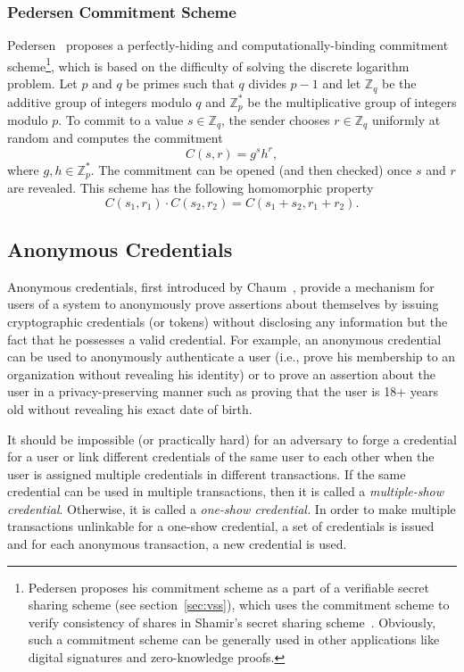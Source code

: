 \documentclass[11pt]{article}
\theoremstyle{plain}
\begin{document}
\subsubsection{Pedersen Commitment Scheme}

Pedersen~\cite{Pedersen:1991:NIS:646756.705507} proposes a perfectly-hiding
and computationally-binding commitment scheme\footnote{Pedersen proposes his commitment scheme as a part of a verifiable
	secret sharing scheme (see section~\ref{sec:vss}), which uses the
	commitment scheme to verify consistency of shares in Shamir's secret
	sharing scheme~\cite{shamir:how}. Obviously, such a commitment scheme
	can be generally used in other applications like digital signatures
	and zero-knowledge proofs.}, which is based on the difficulty of solving the discrete logarithm
problem. Let $p$ and $q$ be primes such that $q$ divides $p-1$
and let $\mathbb{Z}_{q}$ be the additive group of integers modulo
$q$ and $\mathbb{Z}_{p}^{*}$ be the multiplicative group of integers
modulo $p$. To commit to a value $s\in\mathbb{Z}_{q}$, the sender
chooses $r\in\mathbb{Z}_{q}$ uniformly at random and computes the
commitment 
\[
C(s,r)=g^{s}h^{r},
\]
where $g,h\in\mathbb{Z}_{p}^{*}$. The commitment can be opened (and
then checked) once $s$ and $r$ are revealed. This scheme has the
following homomorphic property 
\[
C(s_{1},r_{1})\cdot C(s_{2},r_{2})=C(s_{1}+s_{2},r_{1}+r_{2}).
\]


\subsection{Anonymous Credentials}

Anonymous credentials, first introduced by Chaum~\cite{Chaum:1985:SWI:4372.4373},
provide a mechanism for users of a system to anonymously prove assertions
about themselves by issuing cryptographic credentials (or tokens)
without disclosing any information but the fact that he possesses
a valid credential. For example, an anonymous credential can be used
to anonymously authenticate a user (i.e., prove his membership to
an organization without revealing his identity) or to prove an assertion
about the user in a privacy-preserving manner such as proving that
the user is 18+ years old without revealing his exact date of birth.

It should be impossible (or practically hard) for an adversary to
forge a credential for a user or link different credentials of the
same user to each other when the user is assigned multiple credentials
in different transactions. If the same credential can be used in multiple
transactions, then it is called a \textit{multiple-show credential}.
Otherwise, it is called a \textit{one-show credential.} In order to
make multiple transactions unlinkable for a one-show credential, a
set of credentials is issued and for each anonymous transaction, a
new credential is used.
\end{document}
